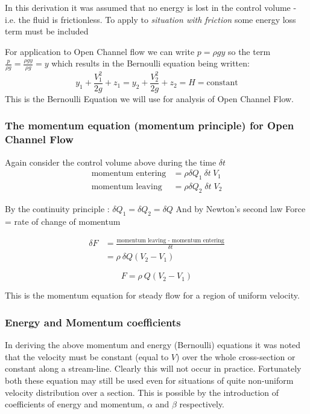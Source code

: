 \documentclass[a4paper, 12pt, british]{article} %
\numberwithin{equation}{section}
\numberwithin{figure}{section}
\numberwithin{table}{section}
\begin{document}
In this derivation it was assumed that no energy is lost in the control volume - i.e. the fluid is frictionless. To apply to \textit{situation with friction} some energy  loss term must be included

For application to Open Channel flow we can write $p = \rho g y$ so the term 
$\frac{p}{\rho g}=\frac{\rho g y}{\rho g} = y$ which results in the Bernoulli equation being written: 
\begin{equation}
y_1  + \frac{V_1^2}{2g} + z_1  = y_2  + \frac{V_2^2}{2g} + z_2 = H = \text{constant}
\label{eq:bernoulli_y}
\end{equation}
This is the Bernoulli Equation we will use for analysis of Open Channel Flow.

\subsubsection{The momentum equation (momentum principle) for Open Channel Flow}

Again consider the control volume above during the time $\delta t$
 \begin{align*}
\text{momentum entering} &= \rho \delta Q_1 \: \delta t\: V_1 \\
\text{momentum leaving} &= \rho \delta Q_2 \; \delta t\; V_2
\label{eq:momentum_principal}
\end{align*}
 

By the continuity principle : $\delta Q_1 = \delta Q_2 = \delta Q$
And by Newton's second law Force = rate of change of momentum

 \begin{align*}
\delta F &= \frac{\text{momentum leaving - momentum entering}}{\delta t} \nonumber\\ 
 &= \rho \: \delta Q(V_2 - V_1)
\end{align*}
 

\begin{equation}
F = \rho \:  Q(V_{2} - V_{1})
\end{equation}

This is the momentum equation for steady flow for a region of uniform velocity.

\subsubsection{Energy and Momentum coefficients}

In deriving the above momentum and energy (Bernoulli) equations it was noted that the velocity must be constant (equal to $V$) over the whole cross-section or constant along a stream-line. Clearly this will not occur in practice.  Fortunately both these equation may still be used even for situations of quite non-uniform velocity distribution over a section. This is possible by the introduction of coefficients of energy and momentum, $\alpha$ and $\beta$ respectively.
\end{document}
